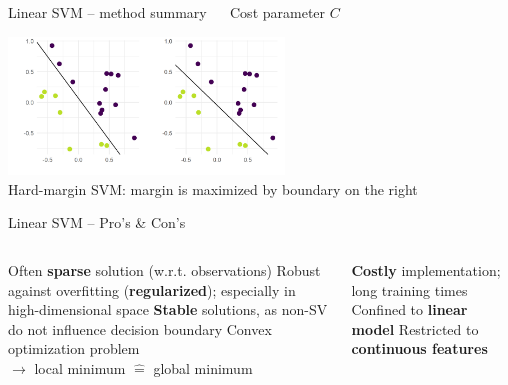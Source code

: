 \begin{vbframe}{Linear SVM -- method summary}
 ~~ Cost parameter \textbf{$C$}

\hfill

\includegraphics[width=0.55\textwidth]{
  figure/linear_classif_1.png}  \\
  \tiny{Hard-margin SVM: margin is maximized by boundary on the right}
  \normalsize

\end{vbframe}


\begin{frame}{Linear SVM -- Pro's \& Con's}

\begin{columns}[onlytextwidth]
  \begin{column}{0.5\textwidth}
    \footnotesize
    \begin{itemize}
      \positem Often \textbf{sparse} solution (w.r.t. observations)
      \positem Robust against overfitting (\textbf{regularized}); especially in 
      high-dimensional space
      \positem \textbf{Stable} solutions, as non-SV do not influence decision boundary
      \positem Convex optimization problem \\
      $\rightarrow$ local minimum $\hat{=}$ global minimum
    \end{itemize}
  \end{column}

  \begin{column}{0.5\textwidth}
    \footnotesize
    \begin{itemize}
      \negitem \textbf{Costly} implementation; long training times
      \negitem Confined to \textbf{linear model}
      \negitem Restricted to \textbf{continuous features}
    \end{itemize}
  \end{column}
\end{columns}

\vfill

\small


\end{frame}

